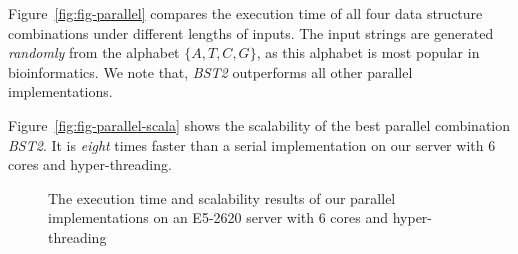Figure~\ref{fig:fig-parallel} compares the execution time of all four
data structure combinations under different lengths of inputs.  The
input strings are generated {\em randomly} from the alphabet $\{A, T,
C, G\}$, as this alphabet is most popular in bioinformatics.  We note
that, {\em BST2} outperforms all other parallel implementations. %

Figure~\ref{fig:fig-parallel-scala} shows the scalability of the best
parallel combination {\em BST2}.  It is {\em eight} times faster than
a serial implementation on our server with 6 cores and
hyper-threading.

\begin{figure}
  \centering
  \caption{The execution time and scalability results of our parallel
    implementations on an E5-2620 server with 6 cores and
    hyper-threading}
\end{figure}
